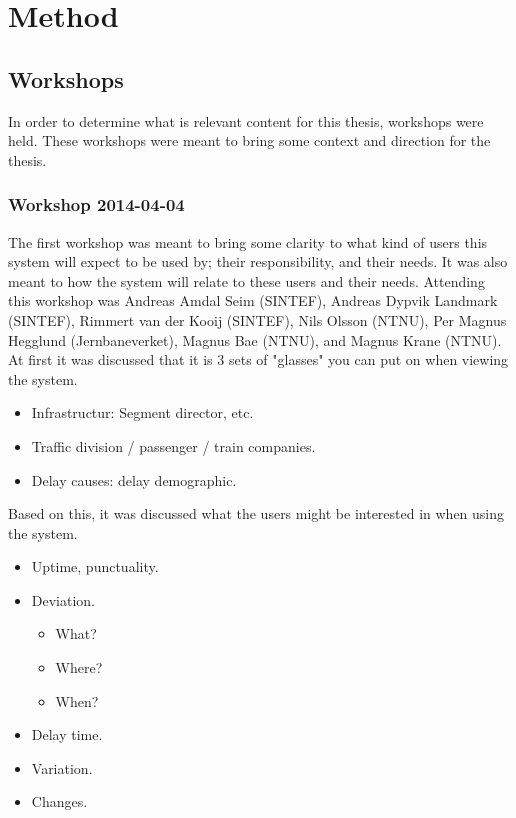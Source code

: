 
\chapter{Method} %
\label{cha:research_questions_and_method}

\section{Workshops} %
\label{sec:workshops}
In order to determine what is relevant content for this thesis, workshops were
held. These workshops were meant to bring some context and direction for the
thesis. 

\subsection{Workshop 2014-04-04} %
\label{sub:workshop_2014_04_04}
The first workshop was meant to bring some clarity to what kind of users this
system will expect to be used by; their responsibility, and their needs.
It was also meant to how the system will relate to these users and their needs.
Attending this workshop was Andreas Amdal Seim (SINTEF), Andreas Dypvik 
Landmark (SINTEF), Rimmert van der Kooij (SINTEF), Nils Olsson (NTNU), Per 
Magnus Hegglund (Jernbaneverket), Magnus Bae (NTNU), and Magnus Krane (NTNU).\\

At first it was discussed that it is 3 sets of "glasses" you can put on when
viewing the system.
\begin{itemize}
	\item Infrastructur: Segment director, etc.
	\item Traffic division / passenger / train companies.
	\item Delay causes: delay demographic.
\end{itemize}

Based on this, it was discussed what the users might be interested in when
using the system.
\begin{itemize}
	\item Uptime, punctuality.
	\item Deviation.
	\begin{itemize}
		\item What?
		\item Where?
		\item When?
	\end{itemize}
	\item Delay time.
	\item Variation.
	\item Changes.
\end{itemize}

